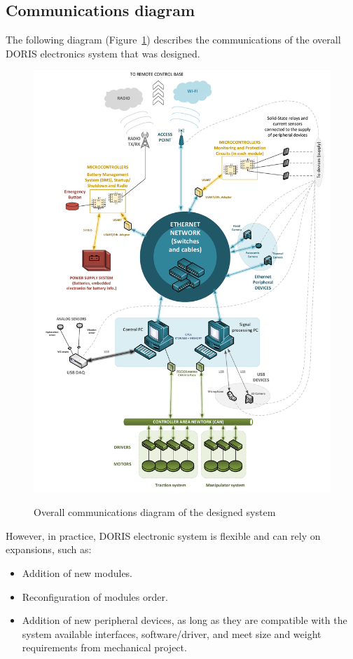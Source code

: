 \subsection{Communications diagram}
The following diagram (Figure~\ref{FIG:DESIGNEDCOMDIAGRAM}) describes the communications of the overall DORIS electronics system that was designed.
\begin{figure}
  \centering
  \includegraphics[angle=90,width=1\columnwidth]{figs/body01/FIGDESIGNEDCOMDIAGRAM.pdf}\\
  \caption[Overall communications diagram of the designed system]{Overall communications diagram of the designed system}
  \label{FIG:DESIGNEDCOMDIAGRAM}
\end{figure}
However, in practice, DORIS electronic system is flexible and can rely on expansions, such as:
\begin{itemize}
  \item Addition of new modules.
  \item Reconfiguration of modules order.
  \item Addition of new peripheral devices, as long as they are compatible with the system available interfaces, software/driver, and meet size and weight requirements from mechanical project.
\end{itemize}

